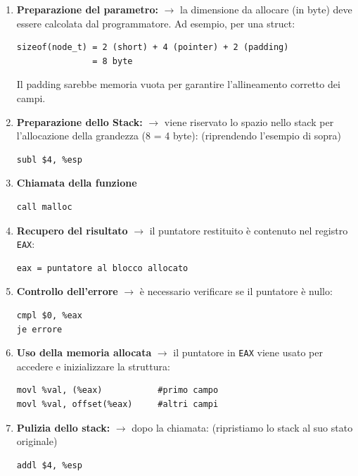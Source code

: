 \begin{enumerate}
    \item \textbf{Preparazione del parametro:} $\rightarrow$
    la dimensione da allocare (in byte) deve essere calcolata dal programmatore. Ad esempio, per una struct:
    \begin{verbatim}
sizeof(node_t) = 2 (short) + 4 (pointer) + 2 (padding)
               = 8 byte
    \end{verbatim}
Il padding sarebbe memoria vuota per garantire l'allineamento corretto dei campi.
    \item \textbf{Preparazione dello Stack:} $\rightarrow$
    viene riservato lo spazio nello stack per l'allocazione
    della grandezza (8 = 4 byte): (riprendendo l'esempio di sopra)
    \begin{verbatim}
subl $4, %esp
    \end{verbatim}
    \item \textbf{Chiamata della funzione}
    \begin{verbatim}
call malloc
    \end{verbatim}

    \item \textbf{Recupero del risultato} $\rightarrow$
    il puntatore restituito è contenuto nel registro \texttt{EAX}:
    \begin{verbatim}
eax = puntatore al blocco allocato
    \end{verbatim}

    \item \textbf{Controllo dell'errore} $\rightarrow$
    è necessario verificare se il puntatore è nullo:
    \begin{verbatim}
cmpl $0, %eax
je errore
    \end{verbatim}

    \item \textbf{Uso della memoria allocata} $\rightarrow$
    il puntatore in \texttt{EAX} viene usato per accedere e inizializzare la struttura:
    \begin{verbatim}
movl %val, (%eax)           #primo campo
movl %val, offset(%eax)     #altri campi
    \end{verbatim}

    \item \textbf{Pulizia dello stack:} $\rightarrow$
    dopo la chiamata: (ripristiamo lo stack al suo stato originale)
    \begin{verbatim}
addl $4, %esp
\end{verbatim}
\end{enumerate}
